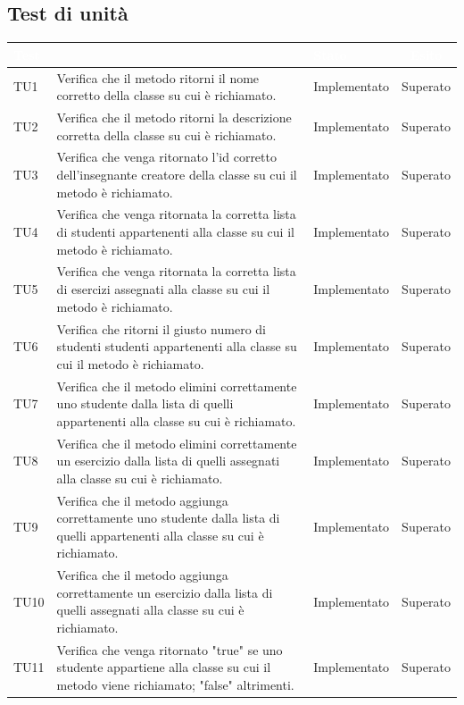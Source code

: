 \subsection{Test di unità}
\begin{longtable}{|>{\centering\arraybackslash}m{1.6cm}|>{\centering\arraybackslash}m{6.41cm}|>{\centering\arraybackslash}m{3.1cm}| c |}		
		\rowcolor{LightBlue}
		\textbf{\textcolor{white}{Test}}
		& \multicolumn{1}{|c|}{\textbf{\textcolor{white}{ Descrizione}}}
		& \textbf{\textcolor{white}{Stato}}
		& \textbf{\textcolor{white}{Esito}}\\
		\hline
		TU1 & Verifica che il metodo ritorni il nome corretto della classe su cui è richiamato. & Implementato & Superato \\ \hline
		TU2 & Verifica che il metodo ritorni la descrizione corretta della classe su cui è richiamato. & Implementato & Superato  \\ \hline
		TU3 & Verifica che venga ritornato l'id corretto dell'insegnante creatore della classe su cui il metodo è richiamato. & Implementato & Superato  \\ \hline
		TU4 & Verifica che venga ritornata la corretta lista di studenti appartenenti alla classe su cui il metodo è richiamato. & Implementato & Superato  \\ \hline
		TU5 & Verifica che venga ritornata la corretta lista di esercizi assegnati alla classe su cui il metodo è richiamato. & Implementato & Superato  \\ \hline
		TU6 & Verifica che ritorni il giusto numero di studenti studenti appartenenti alla classe su cui il metodo è richiamato. & Implementato & Superato  \\ \hline
		TU7 & Verifica che il metodo elimini correttamente uno studente dalla lista di quelli appartenenti alla classe su cui è  richiamato. & Implementato & Superato  \\ \hline
		TU8 & Verifica che il metodo elimini correttamente un esercizio dalla lista di quelli assegnati alla classe su cui è  richiamato. & Implementato & Superato  \\ \hline
		TU9 & Verifica che il metodo aggiunga correttamente uno studente dalla lista di quelli appartenenti alla classe su cui è  richiamato. & Implementato & Superato  \\ \hline
		TU10 & Verifica che il metodo aggiunga correttamente un esercizio dalla lista di quelli assegnati alla classe su cui è  richiamato. & Implementato & Superato  \\ \hline
		TU11 & Verifica che venga ritornato "true" se uno studente appartiene alla classe su cui il metodo viene richiamato; "false" altrimenti. & Implementato & Superato  \\ \hline		

\end{longtable}
